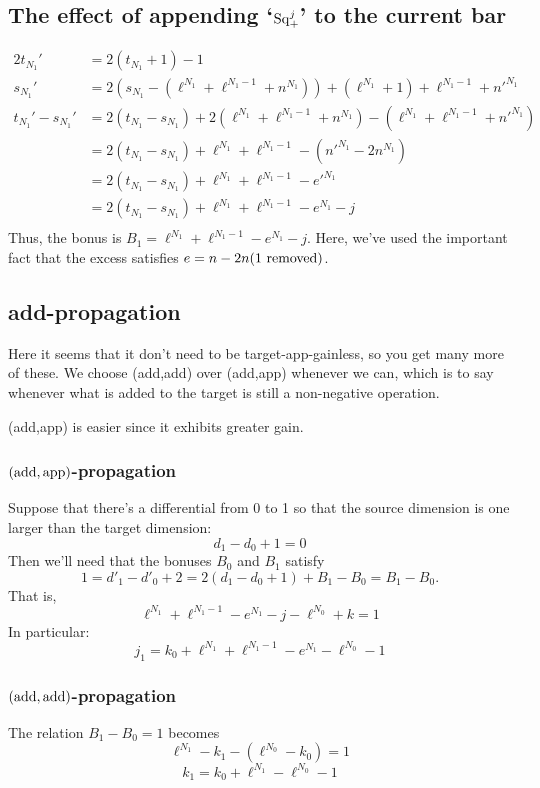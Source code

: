\documentclass[10pt]{article}
\newcommand{\SqShift}{\Sq_{\smash{+}}}
\newcommand{\Sq}{\mathrm{Sq}}
\begin{document}
\begin{conjectured differentials}
\subsection{The effect of appending `$\SqShift^j$' to the current bar}
\begin{alignat*}{2}
t_{N_1}'
&=
2(t_{N_1}+1)-1%
\\
s_{N_1}'&=
2(s_{N_1}-(\ell^{N_1}+\ell^{N_1-1}+n^{N_1}))+ (\ell^{N_1}+1)+\ell^{N_1-1}+{n'}^{N_1}\\
t_{N_1}'-s_{N_1}'&=2(t_{N_1}-s_{N_1})+2(\ell^{N_1}+\ell^{N_1-1}+n^{N_1}) -(\ell^{N_1}+\ell^{N_1-1}+{n'}^{N_1})\\
&=2(t_{N_1}-s_{N_1})+\ell^{N_1}+\ell^{N_1-1}-({n'}^{N_1}-2n^{N_1})\\
&=2(t_{N_1}-s_{N_1})+\ell^{N_1}+\ell^{N_1-1}-{e'}^{N_1}\\
&=2(t_{N_1}-s_{N_1})+\ell^{N_1}+\ell^{N_1-1}-{e}^{N_1}-j\\
\end{alignat*}
Thus, the bonus is $B_1=\ell^{N_1}+\ell^{N_1-1}-{e}^{N_1}-j$.
Here, we've used the important fact that the excess satisfies $e=n-2n(1\textup{ removed})$.
\subsection{add-propagation}
Here it seems that it don't need to be target-app-gainless, so you get many more of these. We choose (add,add) over (add,app) whenever we can, which is to say whenever what is added to the target is still a non-negative operation.

(add,app) is easier since it exhibits greater gain.

\subsubsection{$(\textup{add},\textup{app})$-propagation}
Suppose that there's a differential from 0 to 1 so that the source dimension is one larger than the target dimension:
\[d_1-d_0+1=0\]
Then we'll need that the bonuses $B_0$ and $B_1$ satisfy
\[1=d'_1-d'_0+2=2(d_1-d_0+1)+B_1-B_0=B_1-B_0.\]
That is,
\[\ell^{N_1}+\ell^{N_1-1}-{e}^{N_1}-j-\ell^{N_0}+k=1\]
In particular:
\[j_1=k_0+\ell^{N_1}+\ell^{N_1-1}-{e}^{N_1}-\ell^{N_0}-1\]

\subsubsection{$(\textup{add},\textup{add})$-propagation}
The relation $B_1-B_0=1$ becomes
\[\ell^{N_1}-k_1-(\ell^{N_0}-k_0)=1\]
\[k_1=k_0+\ell^{N_1}-\ell^{N_0}-1\]


\end{conjectured differentials}
\end{document}
